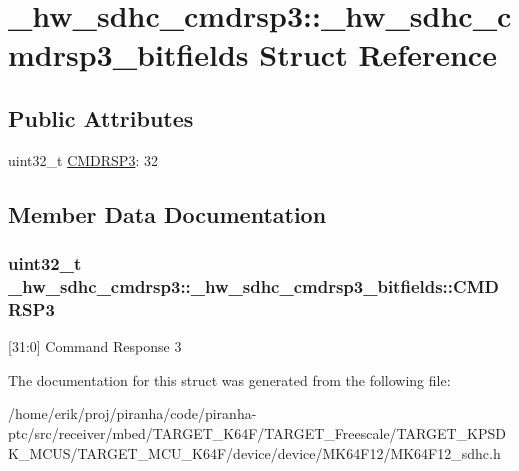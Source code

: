 \hypertarget{struct__hw__sdhc__cmdrsp3_1_1__hw__sdhc__cmdrsp3__bitfields}{}\section{\+\_\+hw\+\_\+sdhc\+\_\+cmdrsp3\+:\+:\+\_\+hw\+\_\+sdhc\+\_\+cmdrsp3\+\_\+bitfields Struct Reference}
\label{struct__hw__sdhc__cmdrsp3_1_1__hw__sdhc__cmdrsp3__bitfields}
\subsection*{Public Attributes}
\begin{DoxyCompactItemize}
\item 
uint32\+\_\+t \hyperlink{struct__hw__sdhc__cmdrsp3_1_1__hw__sdhc__cmdrsp3__bitfields_a382c608df04574ba7a689a2d2f0cc9a9}{C\+M\+D\+R\+S\+P3}\+: 32
\end{DoxyCompactItemize}


\subsection{Member Data Documentation}
\subsubsection[{\texorpdfstring{C\+M\+D\+R\+S\+P3}{CMDRSP3}}]{\setlength{\rightskip}{0pt plus 5cm}uint32\+\_\+t \+\_\+hw\+\_\+sdhc\+\_\+cmdrsp3\+::\+\_\+hw\+\_\+sdhc\+\_\+cmdrsp3\+\_\+bitfields\+::\+C\+M\+D\+R\+S\+P3}\hypertarget{struct__hw__sdhc__cmdrsp3_1_1__hw__sdhc__cmdrsp3__bitfields_a382c608df04574ba7a689a2d2f0cc9a9}{}\label{struct__hw__sdhc__cmdrsp3_1_1__hw__sdhc__cmdrsp3__bitfields_a382c608df04574ba7a689a2d2f0cc9a9}
\mbox{[}31\+:0\mbox{]} Command Response 3 

The documentation for this struct was generated from the following file\+:\begin{DoxyCompactItemize}
\item 
/home/erik/proj/piranha/code/piranha-\/ptc/src/receiver/mbed/\+T\+A\+R\+G\+E\+T\+\_\+\+K64\+F/\+T\+A\+R\+G\+E\+T\+\_\+\+Freescale/\+T\+A\+R\+G\+E\+T\+\_\+\+K\+P\+S\+D\+K\+\_\+\+M\+C\+U\+S/\+T\+A\+R\+G\+E\+T\+\_\+\+M\+C\+U\+\_\+\+K64\+F/device/device/\+M\+K64\+F12/M\+K64\+F12\+\_\+sdhc.\+h\end{DoxyCompactItemize}
